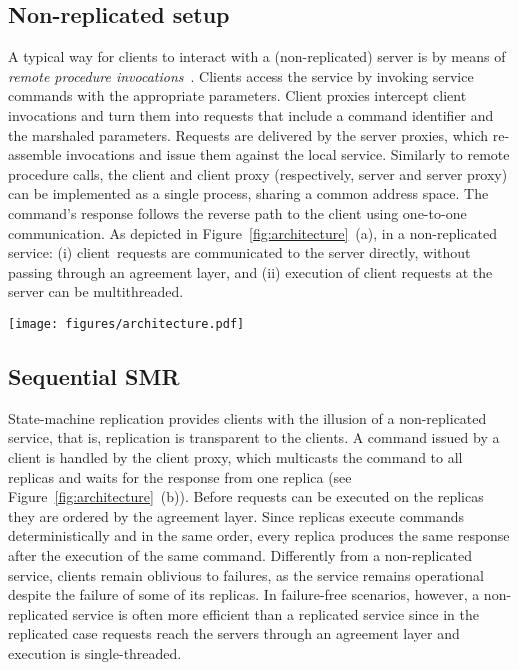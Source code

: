 \documentclass[conference]{IEEEtran}
\newcommand{\sizefactor}{0.9}
\begin{document}
\subsection{Non-replicated setup}

A typical way for clients to interact with a (non-replicated) server is by means of \emph{remote procedure invocations}~\cite{BN84,tanenbaum1995distributed}. Clients access the service by invoking service commands with the appropriate parameters. 
Client proxies intercept client invocations and turn them into requests that include a command identifier and the marshaled parameters. 
Requests are delivered by the server proxies, which re-assemble invocations and issue them against the local service. 
Similarly to remote procedure calls, the client and client proxy (respectively, server and server proxy) can be implemented as a single process, sharing a common address space. 
The command's response follows the reverse path to the client using one-to-one communication. 
As depicted in Figure~\ref{fig:architecture}~(a), in a non-replicated service: (i) client~requests are communicated to the server directly, without passing through an agreement layer, and (ii) execution of client requests at the server can be multithreaded. 

\begin{figure*}[ht]
  \begin{center}
      \texttt{[image: figures/architecture.pdf]} 
    \caption{Architecture differences among (a) non-replicated service, (b) sequential state-machine-replication, (c) pipelined state-machine replication, (d) sequential delivery-parallel execution (SDPE), (e) execute-verify, and (f) parallel delivery-parallel execution. Agreement layer and replicas are fault-tolerant.}
        \label{fig:architecture}
  \end{center}
\end{figure*}

\subsection{Sequential SMR}
\label{sec:seqsmr}





State-machine replication provides clients with the illusion of a non-replicated service, that is, replication is transparent to the clients.
A command issued by a client is handled by the client proxy, which multicasts the command to all replicas and waits for the response from one replica (see Figure~\ref{fig:architecture}~(b)). Before requests can be executed on the replicas they are ordered by the agreement layer. Since replicas execute commands deterministically and in the same order, every replica produces the same response after the execution of the same command.
Differently from a non-replicated service, clients remain oblivious to failures, as the service remains operational despite the failure of some of its replicas. 
In failure-free scenarios, however, a non-replicated service is often more efficient than a replicated service since in the replicated case requests reach the servers through an agreement layer and execution is single-threaded. 
\end{document}
